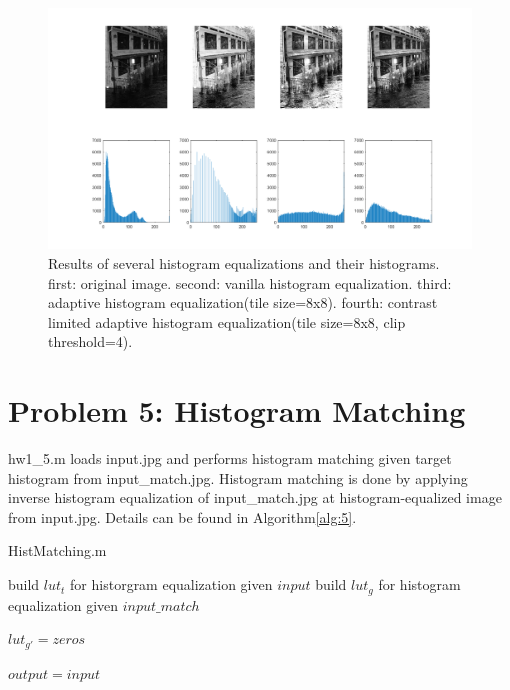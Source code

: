 \documentclass[extendedabs]{bmvc2k}
\begin{document}
\begin{figure}[t]
    \centering
    \includegraphics[width=\linewidth]{hw1_4}
    \caption{Results of several histogram equalizations and their histograms. 
    first: original image. second: vanilla histogram equalization.
    third: adaptive histogram equalization(tile size=8x8).
    fourth: contrast limited adaptive histogram equalization(tile size=8x8, clip threshold=4).}
    \label{fig:6}
    \vspace{-2mm}
\end{figure}

\section*{Problem 5: Histogram Matching}

hw1\_5.m loads input.jpg and performs histogram matching given
target histogram from input\_match.jpg. Histogram matching is done by
applying inverse histogram equalization of input\_match.jpg at histogram-equalized
image from input.jpg. Details can be found in Algorithm\ref{alg:5}.

\begin{algorithm}
\caption{HistMatching.m}
\label{alg:5}
build $lut_t$ for historgram equalization given $input$\;
build $lut_g$ for histogram equalization given $input\_match$\;
        
$lut_{g'} = zeros$\;
        
$output = input$\;
\end{algorithm}
\end{document}
